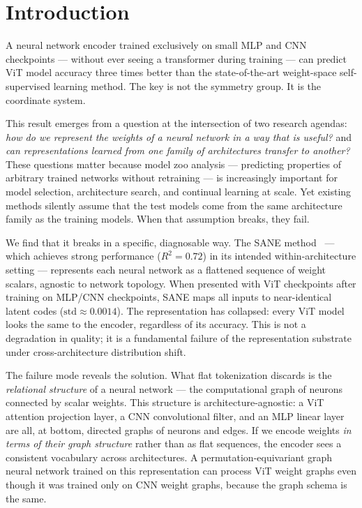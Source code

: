 \section{Introduction}

A neural network encoder trained exclusively on small MLP and CNN checkpoints ---
without ever seeing a transformer during training ---
can predict ViT model accuracy three times better than the state-of-the-art
weight-space self-supervised learning method.
The key is not the symmetry group. It is the coordinate system.

This result emerges from a question at the intersection of two research agendas:
\emph{how do we represent the weights of a neural network in a way that is useful?}
and \emph{can representations learned from one family of architectures transfer to another?}
These questions matter because model zoo analysis --- predicting properties of arbitrary trained
networks without retraining --- is increasingly important for model selection,
architecture search, and continual learning at scale.
Yet existing methods silently assume that the test models come from the same architecture
family as the training models.
When that assumption breaks, they fail.

We find that it breaks in a specific, diagnosable way.
The SANE method~\cite{Schurholt2024Towards} ---
which achieves strong performance ($R^2 = 0.72$) in its intended within-architecture setting ---
represents each neural network as a flattened sequence of weight scalars,
agnostic to network topology.
When presented with ViT checkpoints after training on MLP/CNN checkpoints,
SANE maps all inputs to near-identical latent codes ($\text{std} \approx 0.0014$).
The representation has collapsed: every ViT model looks the same to the encoder,
regardless of its accuracy.
This is not a degradation in quality; it is a fundamental failure of the representation
substrate under cross-architecture distribution shift.

The failure mode reveals the solution.
What flat tokenization discards is the \emph{relational structure} of a neural network ---
the computational graph of neurons connected by scalar weights.
This structure is architecture-agnostic: a ViT attention projection layer,
a CNN convolutional filter, and an MLP linear layer are all, at bottom,
directed graphs of neurons and edges.
If we encode weights \emph{in terms of their graph structure} rather than as flat sequences,
the encoder sees a consistent vocabulary across architectures.
A permutation-equivariant graph neural network trained on this representation
can process ViT weight graphs even though it was trained only on CNN weight graphs,
because the graph schema is the same.

